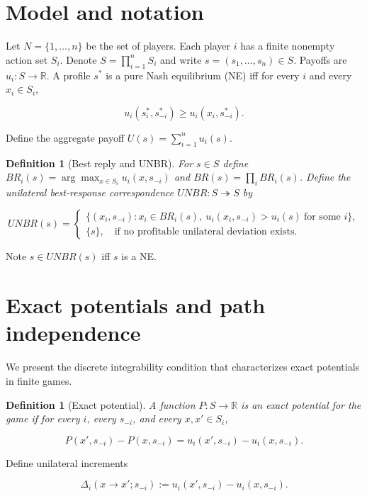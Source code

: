 \documentclass[11pt]{article}
\newtheorem{definition}[theorem]{Definition}
\begin{document}
\section{Model and notation}
Let \(N=\{1,\dots,n\}\) be the set of players. Each player \(i\) has a finite
nonempty action set \(S_i\). Denote \(S=\prod_{i=1}^n S_i\) and write
\(s=(s_1,\dots,s_n)\in S\). Payoffs are \(u_i:S\to\mathbb R\). A profile
\(s^\ast\) is a pure Nash equilibrium (NE) iff for every \(i\) and every
\(x_i\in S_i\),


\[
u_i(s_i^\ast,s_{-i}^\ast)\ge u_i(x_i,s_{-i}^\ast).
\]



Define the aggregate payoff \(U(s)=\sum_{i=1}^n u_i(s)\).

\begin{definition}[Best reply and UNBR]
For \(s\in S\) define \(BR_i(s)=\arg\max_{x\in S_i} u_i(x,s_{-i})\) and
\(BR(s)=\prod_i BR_i(s)\). Define the unilateral best‑response correspondence
\(UNBR:S\twoheadrightarrow S\) by


\[
UNBR(s)=
\begin{cases}
\{(x_i,s_{-i}): x_i\in BR_i(s),\ u_i(x_i,s_{-i})>u_i(s)\ \text{for some }i\},\\
\{s\},\quad\text{if no profitable unilateral deviation exists.}
\end{cases}
\]


\end{definition}

Note \(s\in UNBR(s)\) iff \(s\) is a NE.

\section{Exact potentials and path independence}
We present the discrete integrability condition that characterizes exact
potentials in finite games.

\begin{definition}[Exact potential]
A function \(P:S\to\mathbb R\) is an \emph{exact potential} for the game if
for every \(i\), every \(s_{-i}\), and every \(x,x'\in S_i\),


\[
P(x',s_{-i})-P(x,s_{-i})=u_i(x',s_{-i})-u_i(x,s_{-i}).
\]


\end{definition}

Define unilateral increments


\[
\Delta_i(x\to x';s_{-i}) := u_i(x',s_{-i})-u_i(x,s_{-i}).
\]
\end{document}
